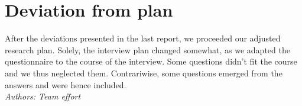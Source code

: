 \documentclass[sigchi-a, authorversion]{acmart}
\begin{document}
\section{Deviation from plan}
\label{deviation_from_plan}
After the deviations presented in the last report, we proceeded our adjusted research plan. Solely, the interview plan changed somewhat, as we adapted the questionnaire to the course of the interview. Some questions didn't fit the course and we thus neglected them. Contrariwise, some questions emerged from the answers and were hence included. \\
\textit{Authors: Team effort}\\

\nocite{*}


\end{document}
